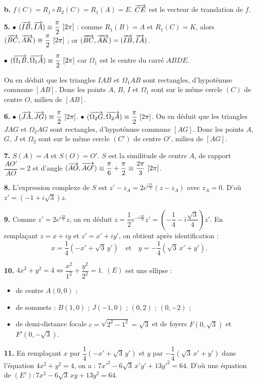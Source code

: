 \documentclass[11pt]{article}
\begin{document}
\textbf{b.} $f(C) = R_1 \circ R_2(C) = R_1(A) = E$. $\overrightarrow{CE}$ est le vecteur de translation de $f$.

\textbf{5.} $\bullet$ $(\vv{IB}, \vv{IA}) \equiv \dfrac{\pi}{2}\ [2\pi]$ : comme $R_1(B) = A$ et $R_1(C) = K$, alors $(\overrightarrow{BC}, \overrightarrow{AK}) \equiv \dfrac{\pi}{2}\ [2\pi]$ ; or $(\overrightarrow{BC}, \overrightarrow{AK}) = (\overrightarrow{IB}, \overrightarrow{IA})$.

$\bullet$ $(\overrightarrow{\Omega_1 B}, \overrightarrow{\Omega_1 A}) \equiv \dfrac{\pi}{2}\ [2\pi]$ car $\Omega_1$ est le centre du carré $ABDE$.

On en déduit que les triangles $IAB$ et $\Omega_1 AB$ sont rectangles, d'hypoténuse commune $[AB]$. Donc les points $A$, $B$, $I$ et $\Omega_1$ sont sur le même cercle $(C)$ de centre $O$, milieu de $[AB]$.

\textbf{6.} $\bullet$ $(\vv{JA}, \vv{JG}) \equiv \dfrac{\pi}{2}\ [2\pi]$. \quad $\bullet$ $(\overrightarrow{\Omega_2 G}, \overrightarrow{\Omega_2 A}) \equiv \dfrac{\pi}{2}\ [2\pi]$. On en déduit que les triangles $JAG$ et $\Omega_2 AG$ sont rectangles, d'hypoténuse commune $[AG]$. Donc les points $A$, $G$, $J$ et $\Omega_2$ sont sur le même cercle $(C')$ de centre $O'$, milieu de $[AG]$.

\textbf{7.} $S(A) = A$ et $S(O) = O'$. $S$ est la similitude de centre $A$, de rapport $\dfrac{AO'}{AO} = 2$ et d'angle $(\vv{AO}, \vv{AO'}) \equiv \dfrac{\pi}{6} + \dfrac{\pi}{2} \equiv \dfrac{2\pi}{3}\ [2\pi]$.

\textbf{8.} L'expression complexe de $S$ est $z' - z_A = 2e^{i\frac{2\pi}{3}}(z - z_A)$ avec $z_A = 0$. D'où $z' = (-1 + i\sqrt{3})z$.

\textbf{9.} Comme $z' = 2e^{i\frac{2\pi}{3}}z$, on en déduit $z = \dfrac{1}{2}e^{-i\frac{2\pi}{3}}z' = \left(-\dfrac{1}{4} - i\dfrac{\sqrt{3}}{4}\right)z'$. En remplaçant $z = x + iy$ et $z' = x' + iy'$, on obtient après identification :
\[ x = \frac{1}{4}(-x' + \sqrt{3}\,y') \quad \text{et} \quad y = -\frac{1}{4}(\sqrt{3}\,x' + y'). \]

\textbf{10.} $4x^2 + y^2 = 4 \Longleftrightarrow \dfrac{x^2}{1^2} + \dfrac{y^2}{2^2} = 1$. $(E)$ est une ellipse :
\begin{itemize}
  \item de centre $A(0, 0)$ ;
  \item de sommets : $B(1, 0)$ ; $J(-1, 0)$ ; $(0, 2)$ ; $(0, -2)$ ;
  \item de demi-distance focale $c = \sqrt{2^2 - 1^2} = \sqrt{3}$ et de foyers $F(0, \sqrt{3})$ et $F'(0, -\sqrt{3})$.
\end{itemize}

\textbf{11.} En remplaçant $x$ par $\dfrac{1}{4}(-x' + \sqrt{3}\,y')$ et $y$ par $-\dfrac{1}{4}(\sqrt{3}\,x' + y')$ dans l'équation $4x^2 + y^2 = 4$, on a : $7x'^2 - 6\sqrt{3}\,x'y' + 13y'^2 = 64$. D'où une équation de $(E') : 7x^2 - 6\sqrt{3}\,xy + 13y^2 = 64$.
\end{document}
